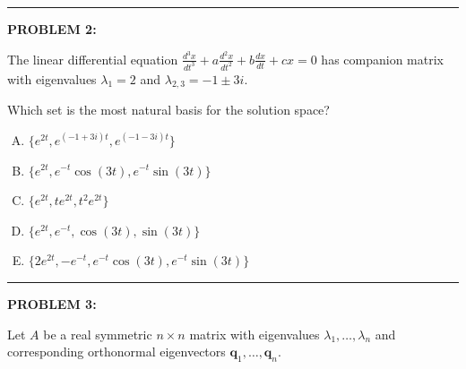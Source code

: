 \documentclass[12pt]{amsart}
\newcommand{\divider}{
  \vspace{-1em} %
  \noindent
  \raisebox{-0.15ex}{\textbullet}%
  \hspace{0.5em}%
  \rule[0.5ex]{0.95\textwidth}{1.0pt}%
  \hspace{0.5em}%
  \raisebox{-0.15ex}{\textbullet}%
  \vspace{0em} %
}
\begin{document}


\divider

{\bf PROBLEM 2:}

The linear differential equation $\displaystyle \frac{d^3x}{dt^3} + a\frac{d^2x}{dt^2} + b\frac{dx}{dt} + cx = 0$ has companion matrix with eigenvalues $\lambda_1 = 2$ and $\lambda_{2,3} = -1 \pm 3i$.

Which set is the most natural basis for the solution space?

\begin{enumerate}[(A)]
\item $\{e^{2t}, e^{(-1+3i)t}, e^{(-1-3i)t}\}$
\item $\{e^{2t}, e^{-t}\cos(3t), e^{-t}\sin(3t)\}$
\item $\{e^{2t}, te^{2t}, t^2e^{2t}\}$
\item $\{e^{2t}, e^{-t}, \cos(3t), \sin(3t)\}$
\item $\{2e^{2t}, -e^{-t}, e^{-t}\cos(3t), e^{-t}\sin(3t)\}$
\end{enumerate}


\divider

{\bf PROBLEM 3:}

Let $A$ be a real symmetric $n \times n$ matrix with eigenvalues $\lambda_1, \ldots, \lambda_n$ and corresponding orthonormal eigenvectors $\mathbf{q}_1, \ldots, \mathbf{q}_n$. 
\end{document}
